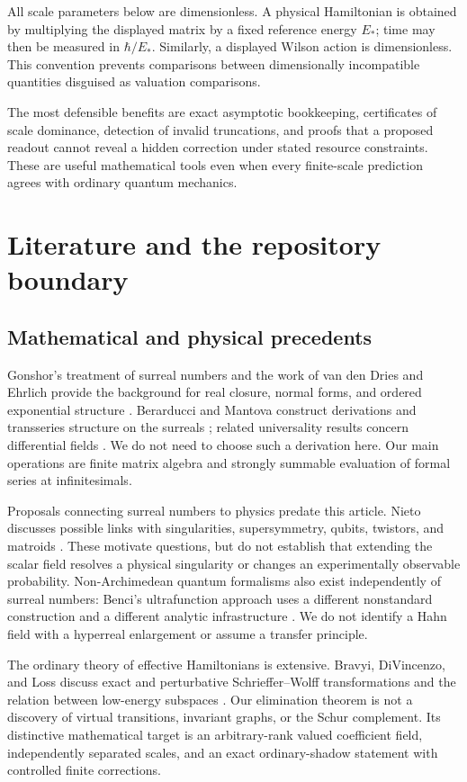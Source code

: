\documentclass[11pt,oneside]{article}
\numberwithin{equation}{section}
\theoremstyle{plain}
\theoremstyle{definition}
\theoremstyle{remark}
\begin{document}
All scale parameters below are dimensionless. A physical Hamiltonian is obtained by multiplying the displayed matrix by a fixed reference energy $E_\ast$; time may then be measured in $\hbar/E_\ast$. Similarly, a displayed Wilson action is dimensionless. This convention prevents comparisons between dimensionally incompatible quantities disguised as valuation comparisons.

The most defensible benefits are exact asymptotic bookkeeping, certificates of scale dominance, detection of invalid truncations, and proofs that a proposed readout cannot reveal a hidden correction under stated resource constraints. These are useful mathematical tools even when every finite-scale prediction agrees with ordinary quantum mechanics.

\section{Literature and the repository boundary}\label{sec:sources}

\subsection{Mathematical and physical precedents}
Gonshor's treatment of surreal numbers and the work of van den Dries and Ehrlich provide the background for real closure, normal forms, and ordered exponential structure \cite{Gonshor,vdDE}. Berarducci and Mantova construct derivations and transseries structure on the surreals \cite{BM}; related universality results concern differential fields \cite{ADH}. We do not need to choose such a derivation here. Our main operations are finite matrix algebra and strongly summable evaluation of formal series at infinitesimals.

Proposals connecting surreal numbers to physics predate this article. Nieto discusses possible links with singularities, supersymmetry, qubits, twistors, and matroids \cite{Nieto2016,Nieto2018}. These motivate questions, but do not establish that extending the scalar field resolves a physical singularity or changes an experimentally observable probability. Non-Archimedean quantum formalisms also exist independently of surreal numbers: Benci's ultrafunction approach uses a different nonstandard construction and a different analytic infrastructure \cite{Benci}. We do not identify a Hahn field with a hyperreal enlargement or assume a transfer principle.

The ordinary theory of effective Hamiltonians is extensive. Bravyi, DiVincenzo, and Loss discuss exact and perturbative Schrieffer--Wolff transformations and the relation between low-energy subspaces \cite{BDL}. Our elimination theorem is not a discovery of virtual transitions, invariant graphs, or the Schur complement. Its distinctive mathematical target is an arbitrary-rank valued coefficient field, independently separated scales, and an exact ordinary-shadow statement with controlled finite corrections.
\end{document}
